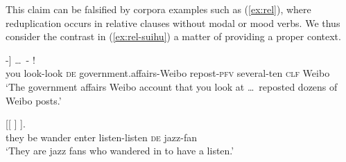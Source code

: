 \z\z
This claim can be falsified by corpora examples such as (\ref{ex:rel}),
where reduplication occurs in relative clauses without modal or mood verbs.
We thus consider the contrast in (\ref{ex:rel-suihu}) a matter of providing a proper context.

\ea\label{ex:rel}

\ea\label{ex:rel1}
\gll [[\objex{ni3} \obj{kan4-kan} \objex{de}] -] \ldots\,  -  !\\
you look-look \textsc{de} government.affairs-Weibo {} repost-\textsc{pfv} several-ten \textsc{clf} Weibo\\ 
\glt `The government affairs Weibo account that you look at \ldots\, reposted dozens of Weibo posts.'




\ex\label{ex:rel2}
\gll {}  [[   ] ].\\
they be wander enter listen-listen \textsc{de} jazz-fan\\ 
\glt `They are jazz fans who wandered in to have a listen.'

